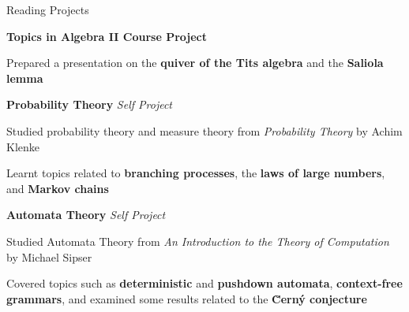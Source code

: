 \begin{rubric}{Reading Projects}

		

	\entry*[2020\phantom{}] \textbf{Topics in Algebra II Course Project}

		Prepared a presentation on the \textbf{quiver of the Tits algebra} and the \textbf{Saliola lemma}

	\entry*[2020] \textbf{Probability Theory} \hfill \textit{Self Project}

		Studied probability theory and measure theory from \textit{Probability Theory} by Achim Klenke

		Learnt topics related to \textbf{branching processes}, the \textbf{laws of large numbers}, and \textbf{Markov chains}

	\entry*[2020\phantom{}] \textbf{Automata Theory} \hfill \textit{Self Project}

		Studied Automata Theory from \textit{An Introduction to the Theory of Computation} by Michael Sipser
        
        Covered topics such as \textbf{deterministic} and \textbf{pushdown automata}, \textbf{context-free grammars}, and examined some results related to the \textbf{\u{C}ern\'{y} conjecture}
\end{rubric}